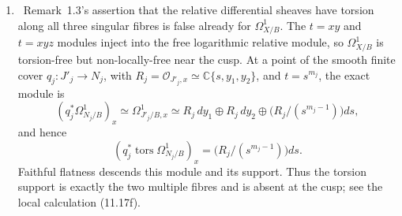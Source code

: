 \begin{enumerate}[leftmargin=1.8em]
Finally, the invariant section
\(\xi=\partial/\partial\zeta_2\), nowhere zero in the locally free relative
sheaf $T_{X/B}=\mathcal E^\vee$, gives the split evaluation sequence
\[
 0\longrightarrow\mathcal O(-1)\longrightarrow f_*\mathcal E
 \xrightarrow{\operatorname{ev}_\xi}\mathcal O\longrightarrow0.
\]
There is a unique lift \(h\in H^0(B,f_*\mathcal E)\) of
\(1\in H^0(B,\mathcal O)\), because
\(H^0(B,\mathcal O(-1))=0\).  On the marked cover it has the uniquely
determined form
\[
 h=(a(z),1)\binom{d\zeta_1}{d\zeta_2},\qquad a(z_2)=\frac12.
\]
Use the genuine invariant target frame
\[
 \omega_2=s\,u_2(s)(\gamma\wedge u)\ell,\qquad u_2(0)=1.
\]
The determinant and final global scalar are
\[
 \operatorname{div}(\det\kappa_0)=p_1+p_2,
 \qquad
 \kappa_1(h\otimes\gamma)|_{p_2}
 =-\frac14\dot\mu(z_2)\,\omega_2|_{p_2}\ne0
 \quad\text{in }(\mathcal L\otimes R^2f_*\mathcal O_X)|_{p_2}.
\]
This uses
\(\dot\tau(z_2)=0\) and \(K(z_2)=6\dot\mu(z_2)^2\ne0\).

Thus, with \(\mathcal K=\ker\kappa_1\),
\[
 \mathcal K\simeq\mathcal O\oplus\mathcal O(-1)^{\oplus2},
\]
and the torsion-free absolute cotangent direct images are
\[
 R^0f_*\Omega_X^1\simeq\mathcal O(-2),\quad
 R^1f_*\Omega_X^1\simeq\mathcal K,
 \quad R^2f_*\Omega_X^1\simeq\mathcal O\oplus\mathcal O(-1).
\]
Therefore
\[
 h^{1,2}=h^{2,1}=1,\qquad h^{1,1}=h^{2,2}=2.
\]
In full, with row index \(q\) and column index \(p\), the Hodge table is
\[
\begin{array}{c|cccc}
q\backslash p&0&1&2&3\\ \hline
3&0&0&0&1\\
2&0&1&2&1\\
1&1&2&1&0\\
0&1&0&0&0.
\end{array}
\]
The two middle \(d_1\)-rows are exact
\(0\to\mathbb C\to\mathbb C^2\to\mathbb C\to0\), and
\[
 \dim_{\mathbb C}E_1=10,\qquad
 \dim_{\mathbb C}E_2=2,\qquad E_2=E_\infty.
\]
See
\cref{prop:log-relative-direct-images,prop:log-ks-divisor,%
prop:absolute-cotangent-direct-images,thm:h12-scalar,cor:exact-hodge-diamond}.

\item \Refuted\ Remark~1.3's assertion that the relative differential
sheaves have torsion along all three singular fibres is false already for
$\Omega^1_{X/B}$.  The $t=xy$ and $t=xyz$ modules inject into the free
logarithmic relative module, so $\Omega^1_{X/B}$ is torsion-free but
non-locally-free near the cusp.  At a point of the smooth finite cover
\(q_j:J'_j\to N_j\), with
\(R_j=\mathcal O_{J'_j,x}\simeq\mathbb C\{s,y_1,y_2\}\), and
\(t=s^{m_j}\), the exact module is
\[
 (q_j^*\Omega^1_{N_j/B})_x
 \simeq\Omega^1_{J'_j/B,x}
 \simeq R_j\,dy_1\oplus R_j\,dy_2
 \oplus\bigl(R_j/(s^{m_j-1})\bigr)ds,
\]
and hence
\[
 (q_j^*\operatorname{tors}\Omega^1_{N_j/B})_x
 =\bigl(R_j/(s^{m_j-1})\bigr)ds.
\]
Faithful flatness descends this module and its support.  Thus the torsion
support is exactly the two multiple fibres and is absent at the cusp; see
the local calculation (11.17f).


\end{enumerate}
